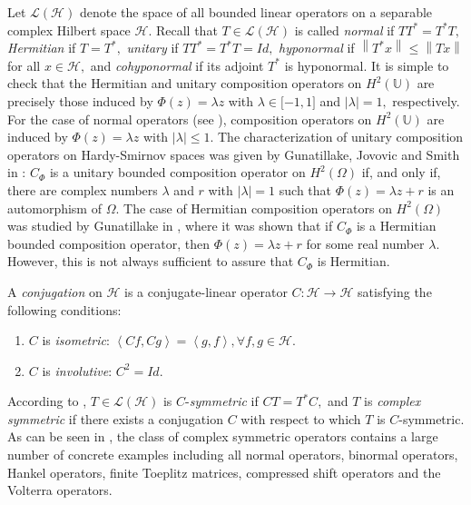 \documentclass[11pt]{amsart}%
\theoremstyle{definition}
\theoremstyle{remark}
\numberwithin{equation}{section}
\begin{document}
Let $\mathcal{L}(\mathcal{H})$ denote the space of all bounded linear
operators on a separable complex Hilbert space $\mathcal{H}.$ Recall that $T\in \mathcal{L}(\mathcal{H})$ is called \textit{normal} if $TT^{\ast
}=T^{\ast}T,$ \textit{Hermitian} if $T=T^{\ast},$ \textit{unitary} if $TT^*=T^*T=Id,$
\textit{hyponormal} if $\left\|
T^{*}x\right\|  \leq\left\|  Tx\right\|  $ for all $x\in\mathcal{H},$ and
\textit{cohyponormal} if its adjoint $T^{*}$ is hyponormal. 
It is simple to check that the Hermitian
and unitary composition operators on $H^{2}(\mathbb{U})$ are precisely those
induced by $\Phi(z)=\lambda z$ with $\lambda\in\lbrack-1,1]$ and
$|\lambda|=1,$ respectively. For the case of normal operators (see
\cite[Theorem 5.1.15]{Avendano-Rosenthal}), composition operators on
$H^{2}(\mathbb{U})$ are induced by $\Phi(z)=\lambda z$ with $|\lambda|\leq1.$
The characterization of unitary composition operators on Hardy-Smirnov spaces
was given by Gunatillake, Jovovic and Smith in \cite[Theorem 3.2]{Jovic}:
$C_{\Phi}$ is a unitary bounded composition operator on $H^{2}(\Omega)$ if,
and only if, there are complex numbers $\lambda$ and $r$ with $|\lambda|=1$
such that $\Phi(z)=\lambda z+r$ is an automorphism of $\Omega.$ The case of
Hermitian composition operators on $H^{2}(\Omega)$ was studied by Gunatillake
in \cite[Theorem 3.3]{Gajath}, where it was shown that if $C_{\Phi}$ is a
Hermitian bounded composition operator, then $\Phi(z)=\lambda z+r$ for some
real number $\lambda$. However, this is not always sufficient to assure that
$C_{\Phi}$ is Hermitian.

 A \textit{conjugation} on $\mathcal{H}$ is a conjugate-linear operator
$C:\mathcal{H}\longrightarrow\mathcal{H}$ satisfying the following conditions:

\begin{enumerate}
\item $C$ is \textit{isometric}: $\left\langle Cf,Cg\right\rangle
=\left\langle g,f\right\rangle , \forall f,g\in\mathcal{H}.$

\item $C$ is \textit{involutive}: $C^{2}=Id.$
\end{enumerate}

According to \cite{Garc2}, $T\in\mathcal{L}(\mathcal{H})$ is $C$-\textit{symmetric} if
$CT=T^{\ast}C,$ and $T$ is \textit{complex symmetric} if there exists a conjugation $C$
with respect to which $T$ is $C$-symmetric. As can be seen in
\cite{Garc3,Garc4,Wogen1,Wogen2}, the class of complex symmetric operators
contains a large number of concrete examples including all normal operators,
binormal operators, Hankel operators, finite Toeplitz matrices, compressed
shift operators and the Volterra operators.
\end{document}
